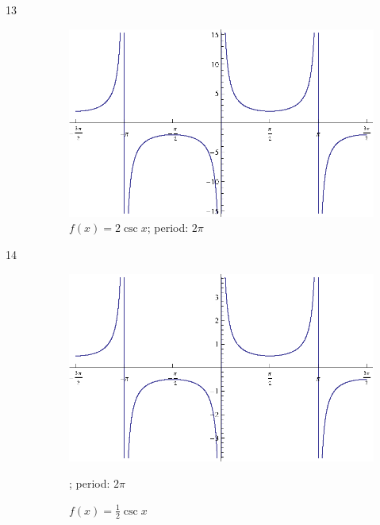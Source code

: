 \documentclass{exam}
\begin{document}
\begin{description}
      \item[13]
        \begin{figure}[H]
          \centering
          \includegraphics[scale=0.9]{exercise13.eps}
          \caption{$f(x) = 2 \csc x$; period: $2 \pi$}
        \end{figure}

      \item[14]
        \begin{figure}[H]
          \centering
          \includegraphics[scale=0.9]{exercise14.eps}
          \caption{$f(x) = \frac{1}{2} \csc x$}; period: $2 \pi$
        \end{figure}


\end{description}
\end{document}
